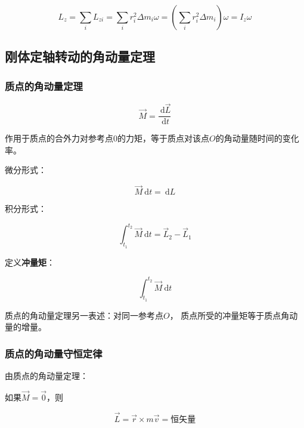 \documentclass[12pt, a4paper]{article}
\numberwithin{equation}{section}
\newcommand{\rmd}{\mathrm{~d}}
\newcommand{\deriv}[2]{\frac{\rmd #1}{\rmd #2}}
\begin{document}
    \begin{equation}
        L_z =\sum_i L_{z i}=\sum_i r_i^2 \Delta m_i \omega
        =\left(\sum_i r_i^2 \Delta m_i\right) \omega=I_z \omega
    \end{equation}

\subsection{刚体定轴转动的角动量定理}

\subsubsection{质点的角动量定理}

    \begin{equation}
        \overrightarrow{M} = \deriv{\overrightarrow{L}}{t}
    \end{equation}

    作用于质点的合外力对参考点0的力矩，等于质点对该点\(O\)的角动量随时间的变化率。

    微分形式：

    \begin{equation}
        \overrightarrow{M} \rmd t = \rmd L
    \end{equation}

    积分形式：

    \begin{equation}
        \int_{t_1}^{t_2} \overrightarrow{M} \rmd t = \overrightarrow{L}_2 - \overrightarrow{L}_1
    \end{equation}

    定义\textbf{冲量矩}：

    \begin{equation}
        \int_{t_1}^{t_2} \overrightarrow{M} \rmd t
    \end{equation}

    质点的角动量定理另一表述：对同一参考点\(O\)，
    质点所受的冲量矩等于质点角动量的增量。

\subsubsection{质点的角动量守恒定律}

    由质点的角动量定理：

    如果\(\overrightarrow{M}=\overrightarrow{0}\)，则

    \begin{equation}
        \overrightarrow{L} = \overrightarrow{r} \times m \overrightarrow{v}
        = \text{恒矢量}
    \end{equation}
\end{document}
